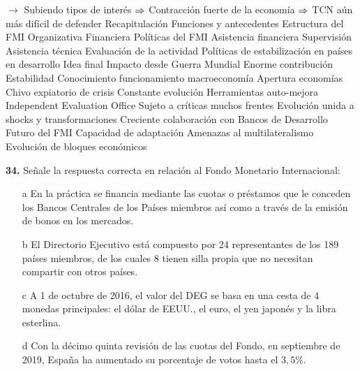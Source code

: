 \documentclass{nuevotema}
\begin{document}
\begin{esquemal}
				\4[] $\to$ Subiendo tipos de interés
				\4[] $\Rightarrow$ Contracción fuerte de la economía
				\4[] $\Rightarrow$ TCN aún más difícil de defender
	\1[] 
		\2 Recapitulación
			\3 Funciones y antecedentes
			\3 Estructura del FMI
				\4 Organizativa
				\4 Financiera
			\3 Políticas del FMI
				\4 Asistencia financiera
				\4 Supervisión
				\4 Asistencia técnica
				\4 Evaluación de la actividad
			\3 Políticas de estabilización en países en desarrollo
		\2 Idea final
			\3 Impacto desde Guerra Mundial
				\4 Enorme contribución
				\4 Estabilidad
				\4 Conocimiento funcionamiento macroeconomía
				\4 Apertura economías
				\4 Chivo expiatorio de crisis
			\3 Constante evolución
				\4 Herramientas auto-mejora
				\4[] Independent Evaluation Office
				\4 Sujeto a críticas muchos frentes
				\4 Evolución unida a shocks y transformaciones
				\4 Creciente colaboración con Bancos de Desarrollo
			\3 Futuro del FMI
				\4 Capacidad de adaptación
				\4 Amenazas al multilateralismo
				\4 Evolución de bloques económicos
\end{esquemal}






























\preguntas


\textbf{34.} Señale la respuesta correcta en relación al Fondo Monetario Internacional:

\begin{itemize}
	\item[a] En la práctica se financia mediante las cuotas o préstamos que le conceden los Bancos Centrales de los Países miembros así como a través de la emisión de bonos en los mercados.
	\item[b] El Directorio Ejecutivo está compuesto por 24 representantes de los 189 países miembros, de los cuales 8 tienen silla propia que no necesitan compartir con otros países.
	\item[c] A 1 de octubre de 2016, el valor del DEG se basa en una cesta de 4 monedas principales: el dólar de EEUU., el euro, el yen japonés y la libra esterlina.
	\item[d] Con la décimo quinta revisión de las cuotas del Fondo, en septiembre de 2019, España ha aumentado su porcentaje de votos hasta el $3,5\%$.
\end{itemize}
\end{document}
